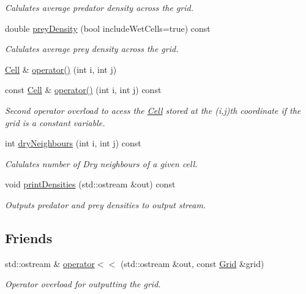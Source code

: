 \begin{DoxyCompactItemize}
$$\begin{DoxyCompactList}\small\item\em Calulates average predator density across the grid. \end{DoxyCompactList}\item 
double \hyperlink{class_grid_a7dc8ae18c31e8e680f6369d7c07ea881}{prey\+Density} (bool include\+Wet\+Cells=true) const
\begin{DoxyCompactList}\small\item\em Calulates average prey density across the grid. \end{DoxyCompactList}\item 
\hyperlink{class_cell}{Cell} \& \hyperlink{class_grid_aed06be122077b3a0c1fe7c412c2535fc}{operator()} (int i, int j)
\item 
const \hyperlink{class_cell}{Cell} \& \hyperlink{class_grid_aa89f5c17cb78658f3b82a3b2d93aeb92}{operator()} (int i, int j) const
\begin{DoxyCompactList}\small\item\em Second operator overload to acess the \hyperlink{class_cell}{Cell} stored at the (i,j)th coordinate if the grid is a constant variable. \end{DoxyCompactList}\item 
int \hyperlink{class_grid_a50f4c0db20b466c84a1d65004e51642e}{dry\+Neighbours} (int i, int j) const
\begin{DoxyCompactList}\small\item\em Calulates number of Dry neighbours of a given cell. \end{DoxyCompactList}\item 
void \hyperlink{class_grid_a4971cb9d47440bc63488993d5647f943}{print\+Densities} (std\+::ostream \&out) const
\begin{DoxyCompactList}\small\item\em Outputs predator and prey densities to output stream. \end{DoxyCompactList}\end{DoxyCompactItemize}
\subsection*{Friends}
\begin{DoxyCompactItemize}
\item 
std\+::ostream \& \hyperlink{class_grid_a3513576c9cced69b185e4be8fe248e8c}{operator$<$$<$} (std\+::ostream \&out, const \hyperlink{class_grid}{Grid} \&grid)
\begin{DoxyCompactList}\small\item\em Operator overload for outputting the grid. \end{DoxyCompactList}\end{DoxyCompactItemize}


